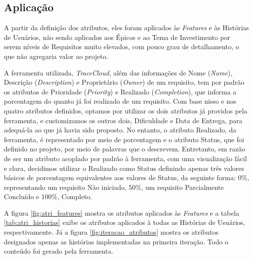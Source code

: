 \begin{itemize}


\end{itemize}

\subsection{Aplicação}

A partir da definição dos atributos, eles foram aplicados às \textit{Features} e às Histórias de Usuários, não sendo aplicados aos Épicos e ao Tema de Investimento por serem níveis de Requisitos muito elevados, com pouco grau de detalhamento, o que não agregaria valor ao projeto.

A ferramenta utilizada, \textit{TraceCloud}\footnotemark, além das informações de Nome (\textit{Name}), Descrição (\textit{Description}) e Proprietário (\textit{Owner}) de um requisito, tem por padrão os atributos de Prioridade (\textit{Priority}) e Realizado (\textit{Completion}), que informa a porcentagem do quanto já foi realizado de um requisito. Com base nisso e nos quatro atributos definidos, optamos por utilizar os dois atributos já providos pela ferramenta, e customizamos os outros dois, Dificuldade e Data de Entrega, para adequá-la ao que já havia sido proposto. No entanto, o atributo Realizado, da ferramenta, é representado por meio de porcentagem e o atributo Status, que foi definido no projeto, por meio de palavras que o descrevem. Entretanto, em razão de ser um atributo acoplado por padrão à ferramenta, com uma visualização fácil e clara, decidimos utilizar o Realizado como Status definindo apenas três valores básicos de porcentagem equivalentes aos valores de Status, da seguinte forma: 0\%, representando um requisito Não iniciado, 50\%, um requisito Parcialmente Concluído e 100\%, Completo.


A figura \ref{fig:atri_features} mostra os atributos aplicados às \textit{Features} e a tabela \ref{tab:atri_historias} exibe os atributos aplicados à todas as Histórias de Usuários, respectivamente. Já a figura \ref{fig:iteracao_atributos} mostra os atributos designados apenas as histórias implementadas na primeira iteração. Todo o conteúdo foi gerado pela ferramenta.


